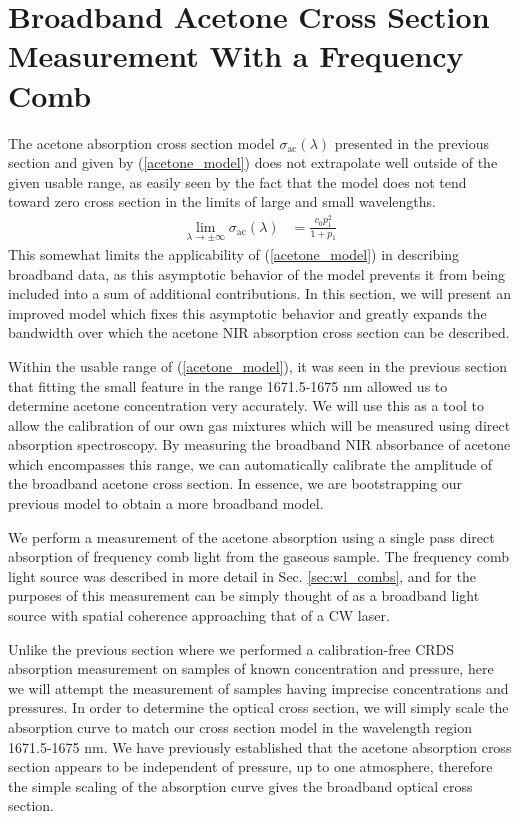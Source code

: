 \documentclass[12pt]{report}
\begin{document}
	\section{Broadband Acetone Cross Section Measurement With a Frequency Comb} \label{sec:acetone_broadband}
	The acetone absorption cross section model $\sigma_\mathrm{ac}(\lambda)$ presented in the previous section and given by (\ref{acetone_model}) does not extrapolate well outside of the given usable range, as easily seen by the fact that the model does not tend toward zero cross section in the limits of large and small wavelengths.
	\begin{align*}
		\lim\limits_{\lambda \rightarrow \pm \infty} \sigma_\mathrm{ac}(\lambda) &= \frac{c_0 p_1^2}{1 + p_1}
	\end{align*}
	This somewhat limits the applicability of (\ref{acetone_model}) in describing broadband data, as this asymptotic behavior of the model prevents it from being included into a sum of additional contributions. In this section, we will present an improved model which fixes this asymptotic behavior and greatly expands the bandwidth over which the acetone NIR absorption cross section can be described.
	
	Within the usable range of (\ref{acetone_model}), it was seen in the previous section that fitting the small feature in the range 1671.5-1675 nm allowed us to determine acetone concentration very accurately. We will use this as a tool to allow the calibration of our own gas mixtures which will be measured using direct absorption spectroscopy. By measuring the broadband NIR absorbance of acetone which encompasses this range, we can automatically calibrate the amplitude of the broadband acetone cross section. In essence, we are bootstrapping our previous model to obtain a more broadband model.
	
	We perform a measurement of the acetone absorption using a single pass direct absorption of frequency comb light from the gaseous sample. The frequency comb light source was described in more detail in Sec. \ref{sec:wl_combs}, and for the purposes of this measurement can be simply thought of as a broadband light source with spatial coherence approaching that of a CW laser.
	
	Unlike the previous section where we performed a calibration-free CRDS absorption measurement on samples of known concentration and pressure, here we will attempt the measurement of samples having imprecise concentrations and pressures. In order to determine the optical cross section, we will simply scale the absorption curve to match our cross section model in the wavelength region 1671.5-1675 nm. We have previously established that the acetone absorption cross section appears to be independent of pressure, up to one atmosphere, therefore the simple scaling of the absorption curve gives the broadband optical cross section.
	
\end{document}
